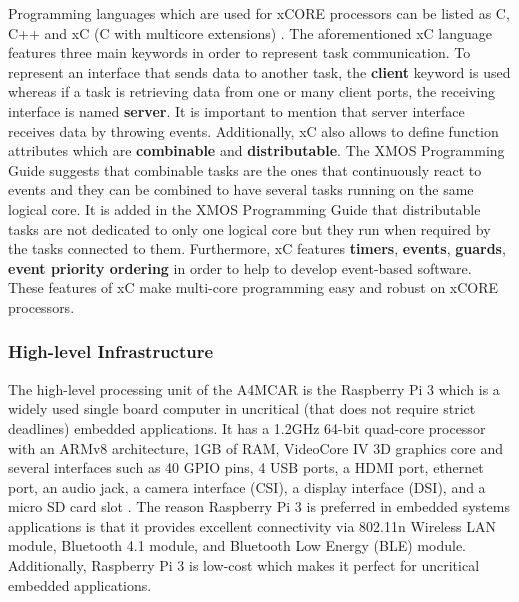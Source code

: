 Programming languages which are used for xCORE processors can be listed as C, C++ and xC (C with multicore extensions) \cite{xmosdatasheet}. The aforementioned xC language features three main keywords in order to represent task communication. To represent an interface that sends data to another task, the \textbf{client} keyword is used whereas if a task is retrieving data from one or many client ports, the receiving interface is named \textbf{server}. It is important to mention that server interface receives data by throwing events. Additionally, xC also allows to define function attributes which are \textbf{combinable} and \textbf{distributable}. The XMOS Programming Guide \cite{xmosprogrguide} suggests that combinable tasks are the ones that continuously react to events and they can be combined to have several tasks running on the same logical core. It is added in the XMOS Programming Guide \cite{xmosprogrguide} that distributable tasks are not dedicated to only one logical core but they run when required by the tasks connected to them. Furthermore, xC features \textbf{timers}, \textbf{events}, \textbf{guards}, \textbf{event priority ordering} in order to help to develop event-based software. These features of xC make multi-core programming easy and robust on xCORE processors.

\subsubsection{High-level Infrastructure} \label{hlinfrasection}
The high-level processing unit of the A4MCAR is the Raspberry Pi 3 which is a widely used single board computer in uncritical (that does not require strict deadlines) embedded applications. It has a 1.2GHz 64-bit quad-core processor with an ARMv8 architecture, 1GB of RAM, VideoCore IV 3D graphics core and several interfaces such as 40 GPIO pins, 4 USB ports, a HDMI port, ethernet port, an audio jack, a camera interface (CSI), a display interface (DSI), and a micro SD card slot \cite{raspberrypiinfo}. The reason Raspberry Pi 3 is preferred in embedded systems applications is that it provides excellent connectivity via 802.11n Wireless LAN module, Bluetooth 4.1 module, and Bluetooth Low Energy (BLE) module. Additionally, Raspberry Pi 3 is low-cost which makes it perfect for uncritical embedded applications.

